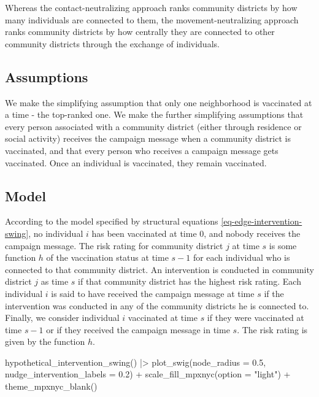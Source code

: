 \documentclass[
  letterpaper,
  DIV=11,
  numbers=noendperiod,
  oneside]{scrreprt}
\newenvironment{Shaded}{\begin{snugshade}}{\end{snugshade}}
\newcommand{\AttributeTok}[1]{\textcolor[rgb]{0.40,0.45,0.13}{#1}}
\newcommand{\FloatTok}[1]{\textcolor[rgb]{0.68,0.00,0.00}{#1}}
\newcommand{\FunctionTok}[1]{\textcolor[rgb]{0.28,0.35,0.67}{#1}}
\newcommand{\NormalTok}[1]{\textcolor[rgb]{0.00,0.23,0.31}{#1}}
\newcommand{\SpecialCharTok}[1]{\textcolor[rgb]{0.37,0.37,0.37}{#1}}
\newcommand{\StringTok}[1]{\textcolor[rgb]{0.13,0.47,0.30}{#1}}
\begin{document}
Whereas the contact-neutralizing approach ranks community districts by
how many individuals are connected to them, the movement-neutralizing
approach ranks community districts by how centrally they are connected
to other community districts through the exchange of individuals.

\hypertarget{assumptions-2}{%
\subsection{Assumptions}\label{assumptions-2}}

We make the simplifying assumption that only one neighborhood is
vaccinated at a time - the top-ranked one. We make the further
simplifying assumptions that every person associated with a community
district (either through residence or social activity) receives the
campaign message when a community district is vaccinated, and that every
person who receives a campaign message gets vaccinated. Once an
individual is vaccinated, they remain vaccinated.

\hypertarget{model-3}{%
\subsection{Model}\label{model-3}}

According to the model specified by structural equations
\ref{eq-edge-intervention-swing}, no individual \(i\) has been
vaccinated at time 0, and nobody receives the campaign message. The risk
rating for community district \(j\) at time \(s\) is some function \(h\)
of the vaccination status at time \(s-1\) for each individual who is
connected to that community district. An intervention is conducted in
community district \(j\) as time \(s\) if that community district has
the highest risk rating. Each individual \(i\) is said to have received
the campaign message at time \(s\) if the intervention was conducted in
any of the community districts he is connected to. Finally, we consider
individual \(i\) vaccinated at time \(s\) if they were vaccinated at
time \(s-1\) or if they received the campaign message in time \(s\). The
risk rating is given by the function \(h\).

\begin{Shaded}
\begin{Highlighting}[]
\FunctionTok{hypothetical\_intervention\_swing}\NormalTok{() }\SpecialCharTok{|\textgreater{}}
  \FunctionTok{plot\_swig}\NormalTok{(}\AttributeTok{node\_radius =} \FloatTok{0.5}\NormalTok{, }\AttributeTok{nudge\_intervention\_labels =} \FloatTok{0.2}\NormalTok{) }\SpecialCharTok{+}
  \FunctionTok{scale\_fill\_mpxnyc}\NormalTok{(}\AttributeTok{option =} \StringTok{"light"}\NormalTok{) }\SpecialCharTok{+}
  \FunctionTok{theme\_mpxnyc\_blank}\NormalTok{()}
\end{Highlighting}
\end{Shaded}
\end{document}
